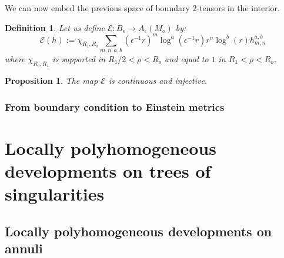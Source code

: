 \documentclass[12pt]{article}
\newtheorem{prop}[thm]{Proposition}
\newtheorem{defn}[thm]{Definition}
\begin{document}
    We can now embed the previous space of boundary $2$-tensors in the interior.
    
    \begin{defn}
     Let us define $\mathcal{E}: B_\epsilon\to A_\epsilon(M_o)$ by:
     $$\mathcal{E}(h):= \chi_{R_1,R_o} \sum_{m,n,a,b} (\epsilon^{-1}r)^{m}\log^a(\epsilon^{-1}r)r^n\log^b(r) h_{m,n}^{a,b}$$
     where $\chi_{R_o,R_1}$ is supported in $R_1/2<\rho<R_o$ and equal to $1$ in $R_1<\rho<R_o$.
    \end{defn}
    
    \begin{prop}
     The map $\mathcal{E}$ is continuous and injective.
    \end{prop}
    
    \subsubsection{From boundary condition to Einstein metrics}
    
    
    
    \section{Locally polyhomogeneous developments on trees of singularities}

\subsection{Locally polyhomogeneous developments on annuli}
\end{document}

